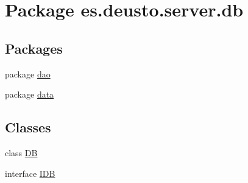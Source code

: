\hypertarget{namespacees_1_1deusto_1_1server_1_1db}{}\section{Package es.\+deusto.\+server.\+db}
\label{namespacees_1_1deusto_1_1server_1_1db}
\subsection*{Packages}
\begin{DoxyCompactItemize}
\item 
package \hyperlink{namespacees_1_1deusto_1_1server_1_1db_1_1dao}{dao}
\item 
package \hyperlink{namespacees_1_1deusto_1_1server_1_1db_1_1data}{data}
\end{DoxyCompactItemize}
\subsection*{Classes}
\begin{DoxyCompactItemize}
\item 
class \hyperlink{classes_1_1deusto_1_1server_1_1db_1_1_d_b}{DB}
\item 
interface \hyperlink{interfacees_1_1deusto_1_1server_1_1db_1_1_i_d_b}{I\+DB}
\end{DoxyCompactItemize}
